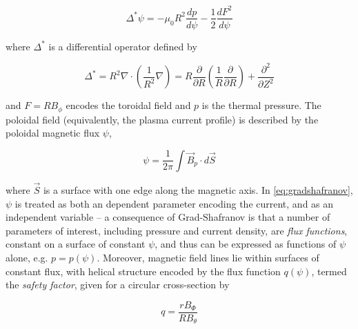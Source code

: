 \begin{equation}\label{eq:gradshafranov}
 \Delta^* \psi = -\mu_0 R^2 \frac{dp}{d\psi} - \frac{1}{2} \frac{dF^2}{d\psi}
\end{equation}

\noindent where $\Delta^*$ is a differential operator defined by

\begin{equation}\label{eq:gsoperator}
 \Delta^* = R^2 \nabla \cdot \left( \frac{1}{R^2} \nabla \right) = R \frac{\partial}{\partial R} \left(\frac{1}{R} \frac{\partial}{\partial R}\right) + \frac{\partial^2}{\partial Z^2}
\end{equation}

\noindent and $F = RB_\phi$ encodes the toroidal field and $p$ is the thermal pressure.  The poloidal field (equivalently, the plasma current profile) is described by the poloidal magnetic flux $\psi$,

\begin{equation}\label{eq:psi}
 \psi = \frac{1}{2\pi} \int \vec{B}_p \cdot d\vec{S}
\end{equation}

\noindent where $\vec{S}$ is a surface with one edge along the magnetic axis.  In \cref{eq:gradshafranov}, $\psi$ is treated as both an dependent parameter encoding the current, and as an independent variable -- a consequence of Grad-Shafranov is that a number of parameters of interest, including pressure and current density, are \emph{flux functions}, constant on a surface of constant $\psi$, and thus can be expressed as functions of $\psi$ alone, e.g. $p = p(\psi)$.  Moreover, magnetic field lines lie within surfaces of constant flux, with helical structure encoded by the flux function $q(\psi)$, termed the \emph{safety factor}, given for a circular cross-section by

\begin{equation}\label{eq:q}
 q = \frac{rB_\Phi}{RB_\theta}
\end{equation}

